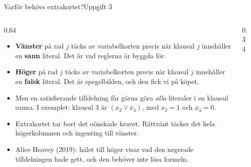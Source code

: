 \documentclass[aspectratio=169,10pt]{beamer}
\newcommand{\hkort}[7][]{%
  \begin{scope}[shift={(#2,#3)},#1]
    \foreach \b [count=\j] in {#4} {\xdef\kortm{\j}}%
    \pgfmathsetmacro{\kH}{0.62+\kortm*0.36+0.34}%
    \path[#7] (0,0) -- (0.52,0) -- (0.52,0.13) -- (0.78,0.13) -- (0.78,0) -- (1.3,0)
      -- (1.3,\kH-0.50) -- (1.17,\kH-0.50) -- (1.17,\kH-0.32) -- (1.3,\kH-0.32) -- (1.3,\kH)
      -- (0,\kH) -- (0,\kH-0.32) -- (0.13,\kH-0.32) -- (0.13,\kH-0.50) -- (0,\kH-0.50) -- cycle;
    \node[font=\scriptsize,inner sep=0pt] at (0.65,\kH-0.25) {#6};
    \foreach \b [count=\j] in {#4} {
      \ifnum\b=1 \path[fill=#7m] (0.38,\kH-0.44-\j*0.36) circle (0.105);
      \else \path[korthal] (0.38,\kH-0.44-\j*0.36) circle (0.105); \fi}
    \foreach \b [count=\j] in {#5} {
      \ifnum\b=1 \path[fill=#7m] (0.92,\kH-0.44-\j*0.36) circle (0.105);
      \else \path[korthal] (0.92,\kH-0.44-\j*0.36) circle (0.105); \fi}
  \end{scope}}
\newcommand{\xbar}[1]{\overline{x}_{#1}}
\begin{document}
\begin{frame}{Varför behövs extrakortet?}{Uppgift 3}
  \begin{columns}[T]
    \begin{column}{0.64\textwidth}
      \begin{itemize}
        \item<1-> \textbf{Vänster} på rad $j$ täcks av variabelkorten precis när klausul $j$ innehåller en \textbf{sann} literal. Det är vad reglerna är byggda för.
        \item<2-> \textbf{Höger} på rad $j$ täcks av variabelkorten precis när klausul $j$ innehåller en \textbf{falsk} literal. Det är spegelbilden, och den fick vi på köpet.
        \item<3-> Men en satisfierande tilldelning får gärna göra \emph{alla} literaler i en klausul sanna. I exemplet: klausul 3 är $(x_2\lor\xbar{4})$, med $x_2=1$ och $x_4=0$.
        \item<4-> Extrakortet tar bort det oönskade kravet. Rättvänt täcker det hela högerkolumnen och ingenting till vänster.
        \item<5-> Alice Heavey (2019): hålet till höger visar vad den negerade tilldelningen hade gett, och den behöver inte lösa formeln.
      \end{itemize}
    \end{column}
    \begin{column}{0.34\textwidth}
      \centering
    \end{column}
  \end{columns}
\end{frame}
\end{document}
